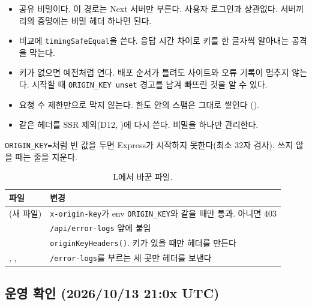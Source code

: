 \begin{itemize}[nosep]
  \item 공유 비밀이다. 이 경로는 Next 서버만 부른다. 사용자 로그인과 상관없다. 서버끼리의 증명에는 비밀 헤더 하나면 된다.
  \item 비교에 \texttt{timingSafeEqual}을 쓴다. 응답 시간 차이로 키를 한 글자씩 알아내는 공격을 막는다.
  \item 키가 없으면 예전처럼 연다. 배포 순서가 틀려도 사이트와 오류 기록이 멈추지 않는다. 시작할 때 \texttt{ORIGIN\_KEY unset} 경고를 남겨 빠뜨린 것을 알 수 있다.
  \item 요청 수 제한만으로 막지 않는다. 한도 안의 스팸은 그대로 쌓인다 ().
  \item 같은 헤더를 SSR 제외(D12, )에 다시 쓴다. 비밀을 하나만 관리한다.
\end{itemize}

\begin{callout}[주의]
\texttt{ORIGIN\_KEY=}처럼 빈 값을 두면 Express가 시작하지 못한다(최소 32자 검사).
쓰지 않을 때는 줄을 지운다.
\end{callout}

\begin{table}[H]
  \caption{L에서 바꾼 파일.}\label{tab:05-originkey-files}
  \small
  \begin{tabularx}{\linewidth}{L{6.4cm} Y}
    \toprule
    파일 & 변경 \\
    \midrule
     (새 파일) & \texttt{x-origin-key}가 env \texttt{ORIGIN\_KEY}와 같을 때만 통과. 아니면 403 \\
    \midrule
     & \texttt{/api/error-logs} 앞에 붙임 \\
    \midrule
     & \texttt{originKeyHeaders()}. 키가 있을 때만 헤더를 만든다 \\
    \midrule
    , ,  & \texttt{/error-logs}를 부르는 세 곳만 헤더를 보낸다 \\
    \bottomrule
  \end{tabularx}
\end{table}

\subsection{운영 확인 (2026/10/13 21:0x UTC)}\label{sec:05-errorlogs-verify}

